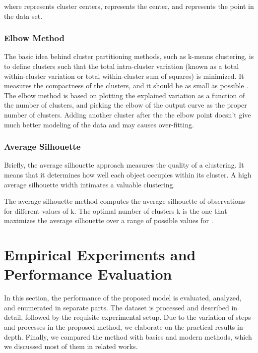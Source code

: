 \documentclass[a4paper,fleqn]{cas-dc}
\begin{document}
where  represents  cluster centers,  represents the  center, and  represents the  point in the data set.

\subsubsection{Elbow Method}
The basic idea behind cluster partitioning methods, such as k-means clustering, is to define clusters such that the total intra-cluster variation (known as a total within-cluster variation or total within-cluster sum of squares) is minimized. It measures the compactness of the clusters, and it should be as small as possible \citep{51kaufman2009a}. The elbow method is based on plotting the explained variation as a function of the number of clusters, and picking the elbow of the output curve as the proper number of clusters. Adding another cluster after the the elbow point doesn't give much better modeling of the data and may causes over-fitting.

\subsubsection{Average Silhouette}
Briefly, the average silhouette approach measures the quality of a clustering. It means that it determines how well each object occupies within its cluster. A high average silhouette width intimates a valuable clustering.

The average silhouette method computes the average silhouette of observations for different values of k. The optimal number of clusters k is the one that maximizes the average silhouette over a range of possible values for  \citep{51kaufman2009a}.

\section{Empirical Experiments and Performance Evaluation}
\label{testandres}
In this section, the performance of the proposed model is evaluated, analyzed, and enumerated in separate parts. The dataset is processed and described in detail, followed by the requisite experimental setup. Due to the variation of steps and processes in the proposed method, we elaborate on the practical results in-depth. Finally, we compared the method with basics and modern methods, which we discussed most of them in related works.
\end{document}
